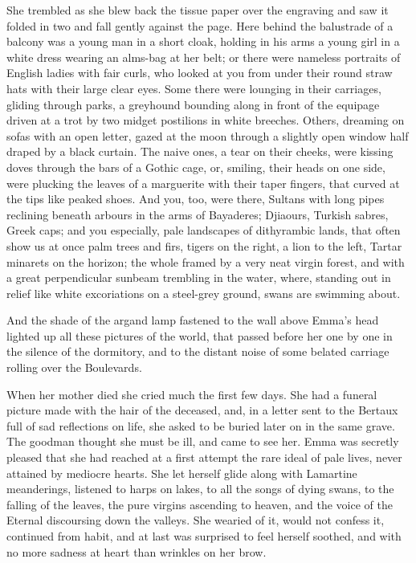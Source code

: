 \documentclass[11pt,twocolumn]{ltugboat}
\begin{document}
She trembled as she blew back the tissue paper over the engraving and
saw it folded in two and fall gently against the page. Here behind the
balustrade of a balcony was a young man in a short cloak, holding in his
arms a young girl in a white dress wearing an alms-bag at her belt; or
there were nameless portraits of English ladies with fair curls, who
looked at you from under their round straw hats with their large clear
eyes. Some there were lounging in their carriages, gliding through
parks, a greyhound bounding along in front of the equipage driven at
a trot by two midget postilions in white breeches. Others, dreaming on
sofas with an open letter, gazed at the moon through a slightly open
window half draped by a black curtain. The naive ones, a tear on their
cheeks, were kissing doves through the bars of a Gothic cage, or,
smiling, their heads on one side, were plucking the leaves of a
marguerite with their taper fingers, that curved at the tips like peaked
shoes. And you, too, were there, Sultans with long pipes reclining
beneath arbours in the arms of Bayaderes; Djiaours, Turkish sabres,
Greek caps; and you especially, pale landscapes of dithyrambic lands,
that often show us at once palm trees and firs, tigers on the right, a
lion to the left, Tartar minarets on the horizon; the whole framed by
a very neat virgin forest, and with a great perpendicular sunbeam
trembling in the water, where, standing out in relief like white
excoriations on a steel-grey ground, swans are swimming about.

And the shade of the argand lamp fastened to the wall above Emma's head
lighted up all these pictures of the world, that passed before her one
by one in the silence of the dormitory, and to the distant noise of some
belated carriage rolling over the Boulevards.

When her mother died she cried much the first few days. She had a
funeral picture made with the hair of the deceased, and, in a letter
sent to the Bertaux full of sad reflections on life, she asked to be
buried later on in the same grave. The goodman thought she must be ill,
and came to see her. Emma was secretly pleased that she had reached at
a first attempt the rare ideal of pale lives, never attained by mediocre
hearts. She let herself glide along with Lamartine meanderings, listened
to harps on lakes, to all the songs of dying swans, to the falling of
the leaves, the pure virgins ascending to heaven, and the voice of
the Eternal discoursing down the valleys. She wearied of it, would not
confess it, continued from habit, and at last was surprised to feel
herself soothed, and with no more sadness at heart than wrinkles on her
brow.
\end{document}
